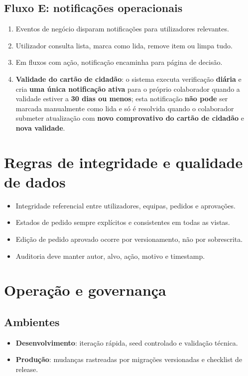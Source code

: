 \documentclass[11pt,a4paper]{article}
\begin{document}
\subsection{Fluxo E: notificações operacionais}
\begin{enumerate}
  \item Eventos de negócio disparam notificações para utilizadores relevantes.
  \item Utilizador consulta lista, marca como lida, remove item ou limpa tudo.
  \item Em fluxos com ação, notificação encaminha para página de decisão.
  \item \textbf{Validade do cartão de cidadão}: o sistema executa verificação \textbf{diária} e cria \textbf{uma única notificação ativa} para o próprio colaborador quando a validade estiver a \textbf{30 dias ou menos}; esta notificação \textbf{não pode} ser marcada manualmente como lida e só é resolvida quando o colaborador submeter atualização com \textbf{novo comprovativo do cartão de cidadão} e \textbf{nova validade}.
\end{enumerate}

\section{Regras de integridade e qualidade de dados}
\begin{itemize}
  \item Integridade referencial entre utilizadores, equipas, pedidos e aprovações.
  \item Estados de pedido sempre explícitos e consistentes em todas as vistas.
  \item Edição de pedido aprovado ocorre por versionamento, não por sobrescrita.
  \item Auditoria deve manter autor, alvo, ação, motivo e timestamp.
\end{itemize}

\section{Operação e governança}
\subsection{Ambientes}
\begin{itemize}
  \item \textbf{Desenvolvimento}: iteração rápida, seed controlado e validação técnica.
  \item \textbf{Produção}: mudanças rastreadas por migrações versionadas e checklist de release.
\end{itemize}
\end{document}
